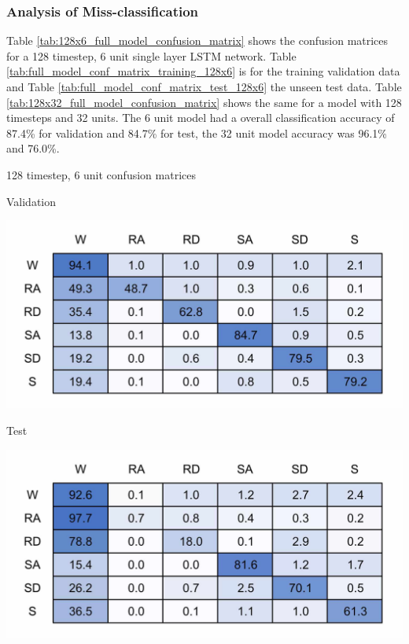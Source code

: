 \documentclass[sensors,article,submit,moreauthors,pdftex]{Definitions/mdpi}
\begin{document}
\subsubsection{Analysis of Miss-classification}
Table \ref{tab:128x6_full_model_confusion_matrix} shows the confusion matrices for a 128 timestep, 6 unit single layer LSTM network. Table \ref{tab:full_model_conf_matrix_training_128x6} is for the training validation data and Table \ref{tab:full_model_conf_matrix_test_128x6} the unseen test data. Table \ref{tab:128x32_full_model_confusion_matrix} shows the same for a model with 128 timesteps and 32 units. The 6 unit model had a overall classification accuracy of 87.4\% for validation and 84.7\% for test, the 32 unit model accuracy was 96.1\% and 76.0\%.

\begin{table}[!hbt]
    \centering
    \caption{128 timestep, 6 unit confusion matrices}
    \label{tab:128x6_full_model_confusion_matrix}
    \begin{subtable}{.45\textwidth}
        \centering
        \caption{Validation}
        \label{tab:full_model_conf_matrix_training_128x6}
        \includegraphics[width=\textwidth]{Figures/results/conf_matricies/Training_128x6_NT.jpg}
    \end{subtable}
    \hfil
    \begin{subtable}{.45\textwidth}
        \centering
        \caption{Test}
        \label{tab:full_model_conf_matrix_test_128x6}
        \includegraphics[width=\textwidth]{Figures/results/conf_matricies/Test_128x6_NT.jpg}
    \end{subtable}
\end{table}
\end{document}
